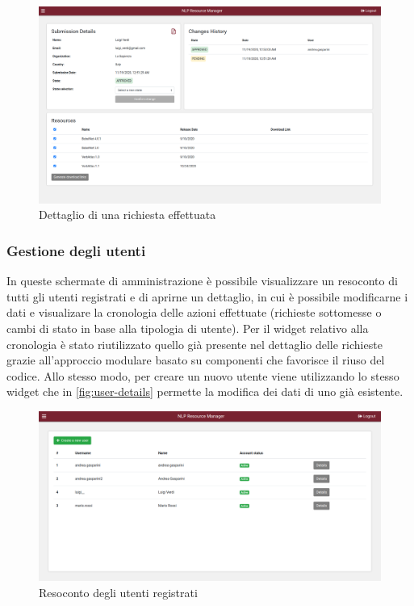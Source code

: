 \begin{figure}[H]
	\centering
	\includegraphics[width=\textwidth]{assets/ui/submission-details.png}
	\caption{Dettaglio di una richiesta effettuata}
	\label{fig:submission-details}
\end{figure}

\subsubsection{Gestione degli utenti}
In queste schermate di amministrazione è possibile visualizzare un resoconto di
tutti gli utenti registrati e di aprirne un dettaglio, in cui è possibile modificarne
i dati e visualizare la cronologia delle azioni effettuate (richieste sottomesse
o cambi di stato in base alla tipologia di utente). Per il widget relativo alla
cronologia è stato riutilizzato quello già presente nel dettaglio delle richieste
grazie all'approccio modulare basato su componenti che favorisce il riuso del codice.
Allo stesso modo, per creare un nuovo utente viene utilizzando lo stesso widget
che in \autoref{fig:user-details} permette la modifica dei dati di uno già esistente.

\begin{figure}[H]
	\centering
	\includegraphics[width=\textwidth]{assets/ui/users-list.png}
	\caption{Resoconto degli utenti registrati}
	\label{fig:users-list}
\end{figure}


